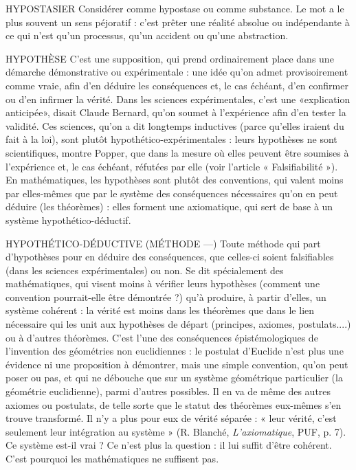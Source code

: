 HYPOSTASIER  Considérer comme hypostase ou comme substance. Le
mot a le plus souvent un sens péjoratif : c’est prêter une
réalité absolue ou indépendante à ce qui n’est qu’un processus, qu’un accident
ou qu’une abstraction.

HYPOTHÈSE C’est une supposition, qui prend ordinairement place dans
une démarche démonstrative ou expérimentale : une idée
qu’on admet provisoirement comme vraie, afin d’en déduire les conséquences
et, le cas échéant, d’en confirmer ou d’en infirmer la vérité. Dans les sciences
expérimentales, c’est une «explication anticipée», disait Claude Bernard,
qu’on soumet à l'expérience afin d’en tester la validité. Ces sciences, qu’on a dit
longtemps inductives (parce qu’elles iraient du fait à la loi), sont plutôt
hypothético-expérimentales : leurs hypothèses ne sont scientifiques, montre Popper,
que dans la mesure où elles peuvent être soumises à l’expérience et, le cas
échéant, réfutées par elle (voir l’article « Falsifiabilité »). En mathématiques, les
hypothèses sont plutôt des conventions, qui valent moins par elles-mêmes que
par le système des conséquences nécessaires qu'on en peut déduire (les
théorèmes) : elles forment une axiomatique, qui sert de base à un système
hypothético-déductif.

HYPOTHÉTICO-DÉDUCTIVE (MÉTHODE —) Toute méthode qui part
d’hypothèses pour en
déduire des conséquences, que celles-ci soient falsifiables (dans les sciences
expérimentales) ou non. Se dit spécialement des mathématiques, qui visent
moins à vérifier leurs hypothèses (comment une convention pourrait-elle être
démontrée ?) qu’à produire, à partir d’elles, un système cohérent : la vérité est
moins dans les théorèmes que dans le lien nécessaire qui les unit aux hypothèses
de départ (principes, axiomes, postulats....) ou à d’autres théorèmes. C’est l’une
des conséquences épistémologiques de l'invention des géométries non euclidiennes :
le postulat d’Euclide n’est plus une évidence ni une proposition à
démontrer, mais une simple convention, qu’on peut poser ou pas, et qui ne
débouche que sur un système géométrique particulier (la géométrie euclidienne),
parmi d’autres possibles. Il en va de même des autres axiomes ou postulats,
de telle sorte que le statut des théorèmes eux-mêmes s’en trouve transformé.
Il n’y a plus pour eux de vérité séparée : « leur vérité, c’est seulement
leur intégration au système » (R. Blanché, {\it L'axiomatique}, PUF, p. 7). Ce système
est-il vrai ? Ce n’est plus la question : il lui suffit d’être cohérent. C’est
pourquoi les mathématiques ne suffisent pas.

